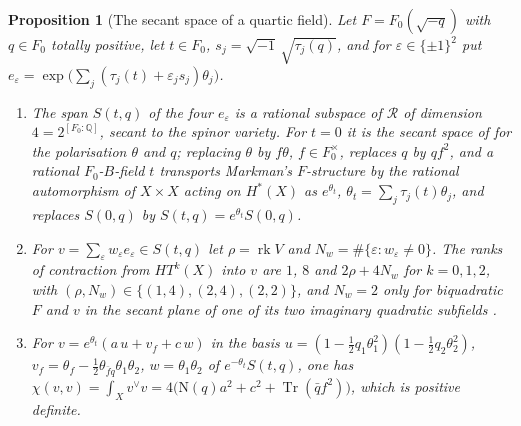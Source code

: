 \documentclass[11pt,reqno]{amsart}
\theoremstyle{plain}
\newtheorem{proposition}[theorem]{Proposition}
\theoremstyle{definition}
\theoremstyle{remark}
\newcommand{\QQ}{\mathbb{Q}}
\newcommand{\Nm}{\mathrm{N}}             %
\DeclareMathOperator{\rk}{rk}
\DeclareMathOperator{\Tr}{Tr}
\begin{document}
\begin{proposition}[The secant space of a quartic field]\label{prop:quarticsecant}
Let $F=F_{0}(\sqrt{-q})$ with $q\in F_{0}$ totally positive, let $t\in F_{0}$,
$s_{j}=\sqrt{-1}\,\sqrt{\tau_{j}(q)}$, and for $\varepsilon\in\{\pm1\}^{2}$ put
$e_{\varepsilon}=\exp\bigl(\sum_{j}(\tau_{j}(t)+\varepsilon_{j}s_{j})\theta_{j}\bigr)$.
\begin{enumerate}[label=\textup{(\roman*)},leftmargin=2.6em,itemsep=2pt]
\item The span $S(t,q)$ of the four $e_{\varepsilon}$ is a rational subspace of
  $\mathcal{R}$ of dimension $4=2^{[F_{0}:\QQ]}$, secant to the spinor variety.
  For $t=0$ it is the secant space of \cite[\S11.1, (11.1.2)]{Mar25c} for the
  polarisation $\theta$ and $q$; replacing $\theta$ by $f\theta$,
  $f\in F_{0}^{\times}$, replaces $q$ by $qf^{2}$, and a rational $F_{0}$-$B$-field
  $t$ transports Markman's $F$-structure by the rational automorphism of
  $X\times\widehat X$ acting on $H^{*}(X)$ as $e^{\theta_{t}}$,
  $\theta_{t}=\sum_{j}\tau_{j}(t)\theta_{j}$, and replaces $S(0,q)$ by
  $S(t,q)=e^{\theta_{t}}S(0,q)$.
\item For $v=\sum_{\varepsilon}w_{\varepsilon}e_{\varepsilon}\in S(t,q)$ let
  $\rho=\rk V$ and $N_{w}=\#\{\varepsilon:w_{\varepsilon}\ne0\}$. The ranks of
  contraction from $HT^{k}(X)$ into $v$ are $1$, $8$ and $2\rho+4N_{w}$ for
  $k=0,1,2$, with $(\rho,N_{w})\in\{(1,4),(2,4),(2,2)\}$, and $N_{w}=2$ only for
  biquadratic $F$ and $v$ in the secant plane of one of its two imaginary
  quadratic subfields \cite[\S11.2.1]{Mar25c}.
\item For $v=e^{\theta_{t}}(a\,u+v_{f}+c\,w)$ in the basis
  $u=(1-\tfrac12q_{1}\theta_{1}^{2})(1-\tfrac12q_{2}\theta_{2}^{2})$,
  $v_{f}=\theta_{f}-\tfrac12\theta_{\bar fq}\theta_{1}\theta_{2}$,
  $w=\theta_{1}\theta_{2}$ of $e^{-\theta_{t}}S(t,q)$, one has
  $\chi(v,v)=\int_{X}v^{\vee}v=4\bigl(\Nm(q)a^{2}+c^{2}+\Tr(\bar q f^{2})\bigr)$,
  which is positive definite.
\end{enumerate}
\end{proposition}
\end{document}
